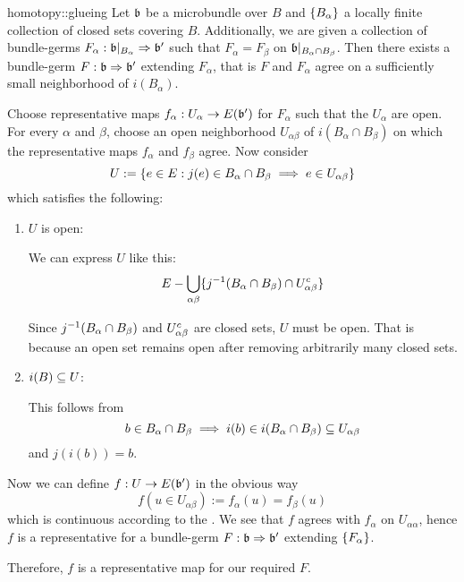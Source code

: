 \begin{mylemma}{homotopy::glueing}
    Let $\mathfrak{b}$ be a microbundle over $B$ and $\{B_\alpha\}$ a locally finite collection of closed sets covering $B$.
    Additionally, we are given a collection of bundle-germs $F_\alpha: \mathfrak{b}\vert_{B_\alpha} \Rightarrow{} \mathfrak{b}'$
    such that $F_\alpha = F_\beta$ on $\mathfrak{b}\vert_{B_\alpha \cap B_\beta}$.
    Then there exists a bundle-germ $F: \mathfrak{b} \Rightarrow{} \mathfrak{b}'$ extending $F_\alpha$,
    that is $F$ and $F_\alpha$ agree on a sufficiently small neighborhood of $i(B_\alpha)$.
\end{mylemma}

\begin{myproof}
    Choose representative maps $f_\alpha: U_\alpha \to E(\mathfrak{b}')$ for $F_\alpha$ such that the $U_\alpha$ are open.
    For every $\alpha$ and $\beta$, choose an open neighborhood $U_{\alpha\beta}$ of $i(B_\alpha \cap B_\beta)$ on which the representative maps $f_\alpha$ and $f_\beta$ agree.
    Now consider
    \[ U := \{ e \in E:j(e) \in B_\alpha \cap B_\beta \implies e \in U_{\alpha\beta}\} \]
    which satisfies the following:
    \begin{enumerate}
        \item $U$ is open:

        We can express $U$ like this:
        \[ E - \bigcup_{\alpha\beta} \{ j^{-1}(B_\alpha \cap B_\beta) \cap U_{\alpha\beta}^c \} \]
        
        Since $j^{-1}(B_\alpha \cap B_\beta)$ and $U_{\alpha\beta}^c$ are closed sets, $U$ must be open.
        That is because an open set remains open after removing arbitrarily many closed sets.
        \item $i(B) \subseteq{} U$:
        
        This follows from
        \[ b \in B_\alpha \cap B_\beta \implies i(b) \in i(B_\alpha \cap B_\beta) \subseteq{} U_{\alpha\beta} \]
        and $j(i(b)) = b$.
    \end{enumerate}
    Now we can define $f: U \to E(\mathfrak{b}')$ in the obvious way
    \[ f(u \in U_{\alpha\beta}) := f_\alpha(u) = f_\beta(u) \]
    which is continuous according to the .
    We see that $f$ agrees with $f_\alpha$ on $U_{\alpha\alpha}$,
    hence $f$ is a representative for a bundle-germ $F: \mathfrak{b} \Rightarrow{} \mathfrak{b}'$ extending $\{F_\alpha\}$.
    
    Therefore, $f$ is a representative map for our required $F$.
\end{myproof}